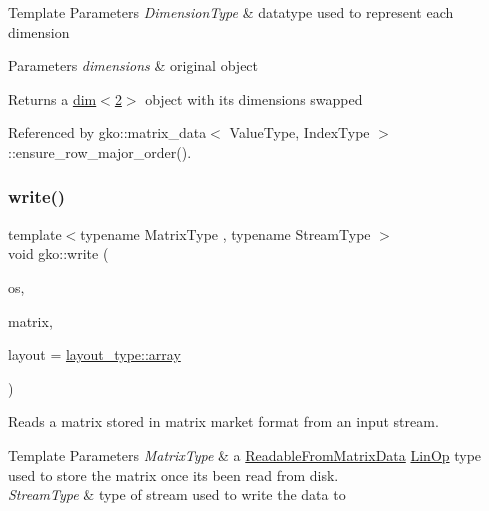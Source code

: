 \begin{DoxyTemplParams}{Template Parameters}
{\em Dimension\+Type} & datatype used to represent each dimension\\
\hline
\end{DoxyTemplParams}

\begin{DoxyParams}{Parameters}
{\em dimensions} & original object\\
\hline
\end{DoxyParams}
\begin{DoxyReturn}{Returns}
a \hyperlink{structgko_1_1dim}{dim$<$2$>$} object with its dimensions swapped 
\end{DoxyReturn}


Referenced by gko\+::matrix\+\_\+data$<$ Value\+Type, Index\+Type $>$\+::ensure\+\_\+row\+\_\+major\+\_\+order().

\mbox{\label{namespacegko_a859dc47a462721d83728d91ab7fa2148}} 
\subsubsection{\texorpdfstring{write()}{write()}}
{\footnotesize\ttfamily template$<$typename Matrix\+Type , typename Stream\+Type $>$ \\
void gko\+::write (\begin{DoxyParamCaption}\item[{Stream\+Type \&\&}]{os,  }\item[{Matrix\+Type $\ast$}]{matrix,  }\item[{\hyperlink{namespacegko_ae749a5ea11a93c1bcc9158d9a6e9fb68}{layout\+\_\+type}}]{layout = {\ttfamily \hyperlink{namespacegko_ae749a5ea11a93c1bcc9158d9a6e9fb68af1f713c9e000f5d3f280adbd124df4f5}{layout\+\_\+type\+::array}} }\end{DoxyParamCaption})\hspace{0.3cm}{\ttfamily [inline]}}



Reads a matrix stored in matrix market format from an input stream. 


\begin{DoxyTemplParams}{Template Parameters}
{\em Matrix\+Type} & a \hyperlink{classgko_1_1ReadableFromMatrixData}{Readable\+From\+Matrix\+Data} \hyperlink{classgko_1_1LinOp}{Lin\+Op} type used to store the matrix once it\textquotesingle{}s been read from disk. \\
\hline
{\em Stream\+Type} & type of stream used to write the data to\\
\hline
\end{DoxyTemplParams}

